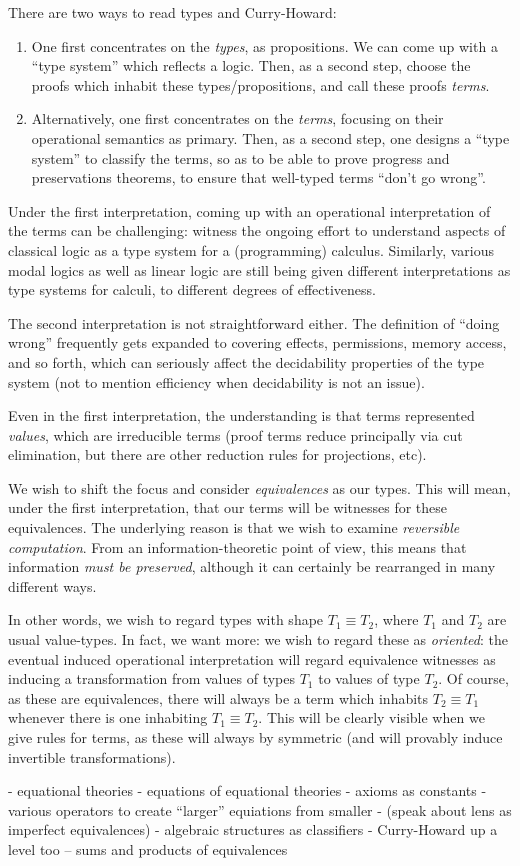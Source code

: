 There are two ways to read types and Curry-Howard: 
\begin{enumerate}
\item One first concentrates on the \emph{types}, as propositions.  We can come up with a ``type system'' which 
reflects a logic.  Then, as a second step, choose the proofs which inhabit these types/propositions, and call these
proofs \emph{terms}.
\item Alternatively, one first concentrates on the \emph{terms}, focusing on their operational semantics as primary.
Then, as a second step, one designs a ``type system'' to classify the terms, so as to be able to prove progress and
preservations theorems, to ensure that well-typed terms ``don't go wrong''.
\end{enumerate}

Under the first interpretation, coming up with an operational interpretation of the terms can be challenging:
witness the ongoing effort to understand aspects of classical logic as a type system for a (programming) calculus.
Similarly, various modal logics as well as linear logic are still being given different interpretations as type
systems for calculi, to different degrees of effectiveness.

The second interpretation is not straightforward either.  The definition of ``doing wrong'' frequently gets 
expanded to covering effects, permissions, memory access, and so forth, which can seriously affect the decidability
properties of the type system (not to mention efficiency when decidability is not an issue).

Even in the first interpretation, the understanding is that terms represented \emph{values}, which are irreducible
terms (proof terms reduce principally via cut elimination, but there are other reduction rules for projections, etc).

We wish to shift the focus and consider \emph{equivalences} as our types.  This will mean, under the first 
interpretation, that our terms will be witnesses for these equivalences.  The underlying reason is that we wish
to examine \emph{reversible computation}.  From an information-theoretic point of view, this means that information
\emph{must be preserved}, although it can certainly be rearranged in many different ways.

In other words, we wish to regard types with shape $T_1\equiv T_2$, where $T_1$ and $T_2$ are usual value-types.
In fact, we want more: we wish to regard these as \emph{oriented}: the eventual induced operational interpretation
will regard equivalence witnesses as inducing a transformation from values of types $T_1$ to values of type $T_2$.
Of course, as these are equivalences, there will always be a term which inhabits $T_2\equiv T_1$ whenever there
is one inhabiting $T_1 \equiv T_2$.  This will be clearly visible when we give rules for terms, as these will always
by symmetric (and will provably induce invertible transformations).

- equational theories
- equations of equational theories
- axioms as constants
- various operators to create ``larger'' equiations from smaller
- (speak about lens as imperfect equivalences)
- algebraic structures as classifiers
- Curry-Howard up a level too -- sums and products of equivalences
